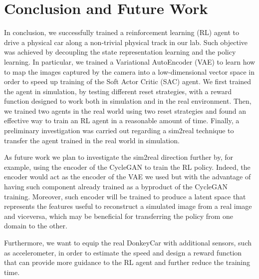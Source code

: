 \chapter{Conclusion and Future Work}

In conclusion, we successfully trained a reinforcement learning (RL) agent to drive a physical car along a non-trivial physical track in our lab. Such objective was achieved by decoupling the state representation learning and the policy learning. In particular, we trained a Variational AutoEncoder (VAE) to learn how to map the images captured by the camera into a low-dimensional vector space in order to speed up training of the Soft Actor Critic (SAC) agent. We first trained the agent in simulation, by testing different reset strategies, with a reward function designed to work both in simulation and in the real environment. Then, we trained two agents in the real world using two reset strategies and found an effective way to train an RL agent in a reasonable amount of time. Finally, a preliminary investigation was carried out regarding a sim2real technique to transfer the agent trained in the real world in simulation.

As future work we plan to investigate the sim2real direction further by, for example, using the encoder of the CycleGAN to train the RL policy. Indeed, the encoder would act as the encoder of the VAE we used but with the advantage of having such component already trained as a byproduct of the CycleGAN training. Moreover, such encoder will be trained to produce a latent space that represents the features useful to reconstruct a simulated image from a real image and viceversa, which may be beneficial for transferring the policy from one domain to the other.

Furthermore, we want to equip the real DonkeyCar with additional sensors, such as accelerometer, in order to estimate the speed and design a reward function that can provide more guidance to the RL agent and further reduce the training time. 

